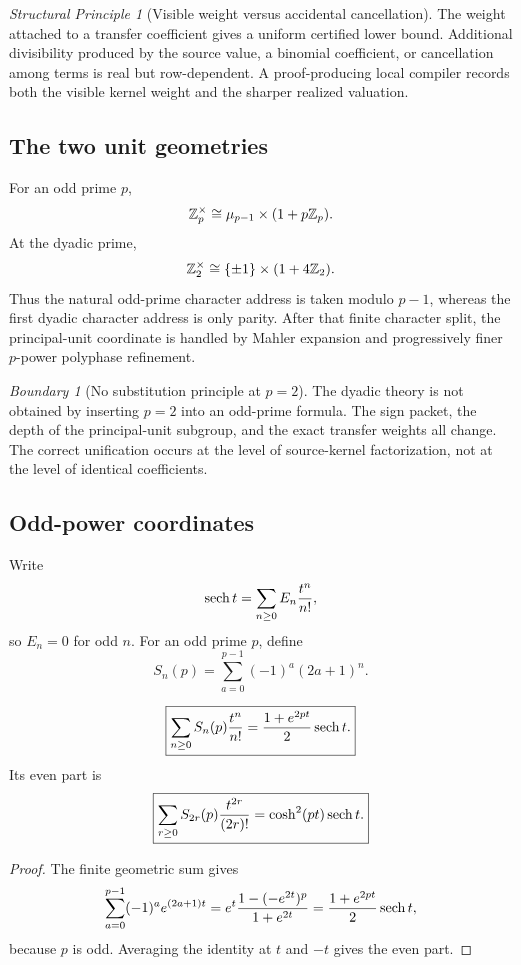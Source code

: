 \documentclass[11pt]{article}
\theoremstyle{definition}\newtheorem{definition}[theorem]{Definition}\newtheorem{example}[theorem]{Example}\newtheorem{construction}[theorem]{Construction}\newtheorem{algorithm}[theorem]{Algorithm}\newtheorem{conjecture}[theorem]{Conjecture}\newtheorem{problem}[theorem]{Problem}
\theoremstyle{remark}\newtheorem{remark}[theorem]{Remark}\newtheorem{boundary}[theorem]{Boundary}\newtheorem{certificate}[theorem]{Computational Certificate}\newtheorem{classical}[theorem]{Classical Input}\newtheorem{principle}[theorem]{Structural Principle}
\begin{document}
\begin{principle}[Visible weight versus accidental cancellation]
The weight attached to a transfer coefficient gives a uniform certified lower bound. Additional divisibility produced by the source value, a binomial coefficient, or cancellation among terms is real but row-dependent. A proof-producing local compiler records both the visible kernel weight and the sharper realized valuation.
\end{principle}

\subsection{The two unit geometries}
For an odd prime $p$,
\[
 \mathbb Z_p^\times\cong\mu_{p-1}\times(1+p\mathbb Z_p).
\]
At the dyadic prime,
\[
 \mathbb Z_2^\times\cong\{\pm1\}\times(1+4\mathbb Z_2).
\]
Thus the natural odd-prime character address is taken modulo $p-1$, whereas the first dyadic character address is only parity. After that finite character split, the principal-unit coordinate is handled by Mahler expansion and progressively finer $p$-power polyphase refinement.

\begin{boundary}[No substitution principle at $p=2$]
The dyadic theory is not obtained by inserting $p=2$ into an odd-prime formula. The sign packet, the depth of the principal-unit subgroup, and the exact transfer weights all change. The correct unification occurs at the level of source-kernel factorization, not at the level of identical coefficients.
\end{boundary}

\subsection{Odd-power coordinates}
Write
\[
 \operatorname{sech} t=\sum_{n\geq0}E_n\frac{t^n}{n!},
\]
so $E_n=0$ for odd $n$. For an odd prime $p$, define
\[
 \boxed{S_n(p)=\sum_{a=0}^{p-1}(-1)^a(2a+1)^n.}
\]

\begin{lemma}
\[
 \boxed{\sum_{n\geq0}S_n(p)\frac{t^n}{n!}=\frac{1+e^{2pt}}2\operatorname{sech} t.}
\]
Its even part is
\[
 \boxed{\sum_{r\geq0}S_{2r}(p)\frac{t^{2r}}{(2r)!}=\cosh^2(pt)\operatorname{sech} t.}
\]
\end{lemma}

\begin{proof}
The finite geometric sum gives
\[
 \sum_{a=0}^{p-1}(-1)^ae^{(2a+1)t}
 =e^t\frac{1-(-e^{2t})^p}{1+e^{2t}}
 =\frac{1+e^{2pt}}2\operatorname{sech} t,
\]
because $p$ is odd. Averaging the identity at $t$ and $-t$ gives the even part.
\end{proof}
\end{document}

